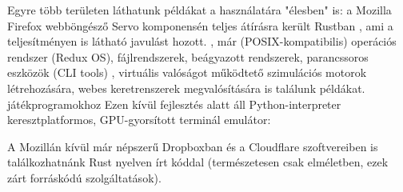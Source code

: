 Egyre több területen láthatunk példákat a használatára "élesben" is: a Mozilla Firefox webböngésző Servo komponensén teljes átírásra került Rustban
, ami a teljesítményen is látható javulást hozott. %
, már (POSIX-kompatibilis) operációs rendszer (Redux OS), fájlrendszerek, beágyazott rendszerek, parancssoros eszközök (CLI tools) %
, virtuális valóságot működtető szimulációs motorok létrehozására, webes keretrenszerek megvalósítására is találunk példákat. %
játékprogramokhoz %
Ezen kívül fejlesztés alatt áll Python-interpreter %
keresztplatformos, GPU-gyorsított terminál emulátor: %

A Mozillán kívül már népszerű Dropboxban és a Cloudflare szoftvereiben is találkozhatnánk Rust nyelven írt kóddal (természetesen csak elméletben, ezek zárt forráskódú szolgáltatások).
